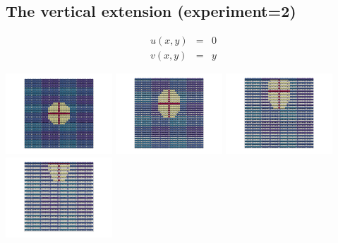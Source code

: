 \newpage
\subsection*{The vertical extension (experiment=2)} 

\begin{eqnarray}
u(x,y)&=&0 \\
v(x,y)&=&y
\end{eqnarray}




\begin{center}
\includegraphics[width=4cm]{python_codes/fieldstone_89/results/vertical/paint0000}
\includegraphics[width=4cm]{python_codes/fieldstone_89/results/vertical/paint0005}
\includegraphics[width=4cm]{python_codes/fieldstone_89/results/vertical/paint0010}
\includegraphics[width=4cm]{python_codes/fieldstone_89/results/vertical/paint0015}
\end{center}


